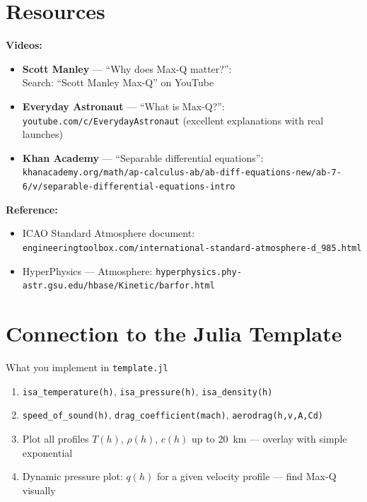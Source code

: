\documentclass[12pt, a4paper]{article}
\begin{document}
\begin{solutionspace}[9cm]
\end{solutionspace}

\section{Resources}

\begin{hintbox}
\textbf{Videos:}
\begin{itemize}
  \item \textbf{Scott Manley} — ``Why does Max-Q matter?'':\\
        Search: ``Scott Manley Max-Q'' on YouTube
  \item \textbf{Everyday Astronaut} — ``What is Max-Q?'':\\
        \texttt{youtube.com/c/EverydayAstronaut} (excellent explanations with real launches)
  \item \textbf{Khan Academy} — ``Separable differential equations'':\\
        \texttt{khanacademy.org/math/ap-calculus-ab/ab-diff-equations-new/ab-7-6/v/separable-differential-equations-intro}
\end{itemize}
\textbf{Reference:}
\begin{itemize}
  \item ICAO Standard Atmosphere document: \texttt{engineeringtoolbox.com/international-standard-atmosphere-d\_985.html}
  \item HyperPhysics — Atmosphere: \texttt{hyperphysics.phy-astr.gsu.edu/hbase/Kinetic/barfor.html}
\end{itemize}
\end{hintbox}

\section{Connection to the Julia Template}

\begin{theorybox}{What you implement in \texttt{template.jl}}
\begin{enumerate}
  \item \texttt{isa\_temperature(h)}, \texttt{isa\_pressure(h)}, \texttt{isa\_density(h)}
  \item \texttt{speed\_of\_sound(h)}, \texttt{drag\_coefficient(mach)}, \texttt{aerodrag(h,v,A,Cd)}
  \item Plot all profiles $T(h)$, $\rho(h)$, $c(h)$ up to 20~km — overlay with simple exponential
  \item Dynamic pressure plot: $q(h)$ for a given velocity profile — find Max-Q visually
\end{enumerate}
\end{theorybox}
\end{document}
